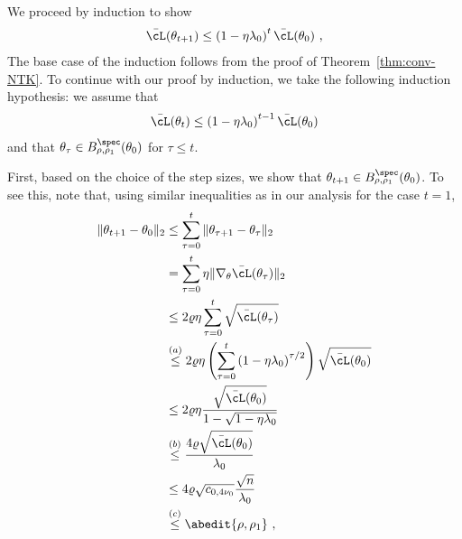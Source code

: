 

We proceed by induction to show
\begin{align}
\bar{\cL}(\theta_{t+1}) \leq \left(1- \eta \lambda_0 \right)^{t} \bar{\cL}(\theta_0)~,
\end{align}
 The base case of the induction follows from the proof of Theorem~\ref{thm:conv-NTK}.
To continue with our proof by induction, we take the following induction hypothesis: we assume that 
\begin{align}
\bar{\cL}(\theta_t) \leq \left(1- \eta \lambda_0 \right)^{t-1} \bar{\cL}(\theta_0)
\end{align}
and that $\theta_\tau\in B^{\spec}_{\rho,\rho_1}(\theta_0)$ for $\tau\leq t$.

First, based on the choice of the step sizes, we show that $\theta_{t+1} \in B_{\rho,\rho_1}^{\spec}(\theta_0)$. To see this, note that, using similar inequalities as in our analysis for the case $t=1$,
\begin{align*}
\| \theta_{t+1} - \theta_0 \|_2 & \leq \sum_{\tau=0}^{t} \| \theta_{\tau+1} - \theta_{\tau} \|_2 \\
& = \sum_{\tau=0}^t \eta \| \nabla_\theta \bar{\cL}(\theta_{\tau})\|_2 \\
& \leq 2 \varrho \eta   \sum_{\tau=0}^t  \sqrt{\bar{\cL}(\theta_\tau)} \\
& \overset{(a)}{\leq} 2 \varrho \eta   \left(\sum_{\tau=0}^t \left(1 - \eta \lambda_0 \right)^{\tau/2} \right) \sqrt{\bar{\cL}(\theta_0)}\\
& \leq 2 \varrho \eta \frac{\sqrt{\bar{\cL}(\theta_0)}}{1 - \sqrt{1- \eta \lambda_0}} \\
& \overset{(b)}{\leq} \frac{4 \varrho \sqrt{\bar{\cL}(\theta_0)}}{\lambda_0}\\
& \leq 4 \varrho \sqrt{c_{0,4\nu_0}} \frac{\sqrt{n} }{\lambda_0} \\
& \overset{(c)}{\leq} \abedit{\rho, \rho_1}~,
\end{align*}

